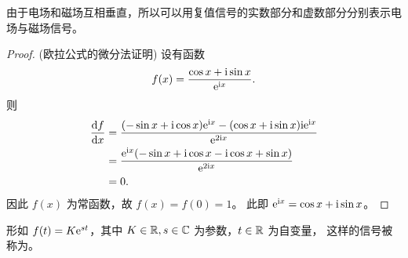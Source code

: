\begin{example}[复值信号在电磁场中的应用]
    由于电场和磁场互相垂直，所以可以用复值信号的实数部分和虚数部分分别表示电场与磁场信号。
\end{example}

\begin{proof}
    (欧拉公式的微分法证明) 设有函数
    \begin{align*}
        f(x) = \frac{\cos x + \mathrm{i} \sin x}{\mathrm{e}^{\mathrm{i} x}}.
    \end{align*}
    则
    \begin{align*}
        \frac{\mathrm{d}f}{\mathrm{d}x} & = \frac{(-\sin x + \mathrm{i} \cos x)\mathrm{e}^{\mathrm{i} x}
                    - (\cos x + \mathrm{i} \sin x)\mathrm{i} \mathrm{e}^{\mathrm{i} x}}
                    {\mathrm{e}^{2\mathrm{i} x}} \\
        & = \frac{\mathrm{e}^{\mathrm{i} x}(-\sin x + \mathrm{i} \cos x - \mathrm{i} \cos x + \sin x)}{\mathrm{e}^{2\mathrm{i} x}} \\
        & = 0.
    \end{align*}
    因此 $f(x)$ 为常函数，故 $f(x) = f(0) = 1$。
    此即 $\mathrm{e}^{\mathrm{i} x} = \cos x + \mathrm{i} \sin x$。
\end{proof}

\begin{definition}[复指数信号]
    形如 $f(t) = K\mathrm{e}^{st}$，其中 $K \in \mathbb{R}, s \in \mathbb{C}$ 为参数，$t \in \mathbb{R}$ 为自变量，
    这样的信号被称为。
\end{definition}

